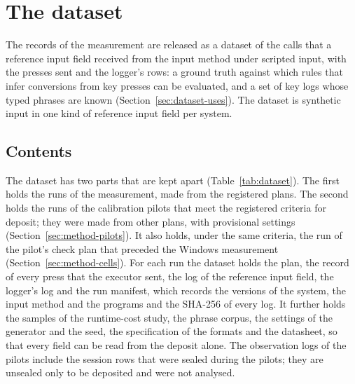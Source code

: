 
\section{The dataset}
\label{sec:dataset}

The records of the measurement are released as a dataset of the calls that a reference input field received from the
input method under scripted input, with the presses sent and the logger's rows: a ground truth against which rules
that infer conversions from key presses can be evaluated, and a set of key logs whose typed phrases are known
(Section~\ref{sec:dataset-uses}). The dataset is synthetic input in one kind of reference input field per system.

\subsection{Contents}
\label{sec:dataset-contents}

The dataset has two parts that are kept apart (Table~\ref{tab:dataset}). The first holds the runs of the measurement,
made from the registered plans. The second holds the runs of the calibration pilots that meet the registered criteria
for deposit; they were made from other plans, with provisional settings (Section~\ref{sec:method-pilots}). It also
holds, under the same criteria, the run of the pilot's check plan that preceded the Windows measurement
(Section~\ref{sec:method-cells}). For each run the dataset holds the plan, the record of every press that the executor
sent, the log of the reference input field, the logger's log and the run manifest, which records the versions of the
system, the input method and the programs and the SHA-256 of every log. It further holds the samples of the
runtime-cost study, the phrase corpus, the settings of the generator and the seed, the specification of the formats and
the datasheet, so that every field can be read from the deposit alone. The observation logs of the pilots include the
session rows that were sealed during the pilots; they are unsealed only to be deposited and were not analysed.

